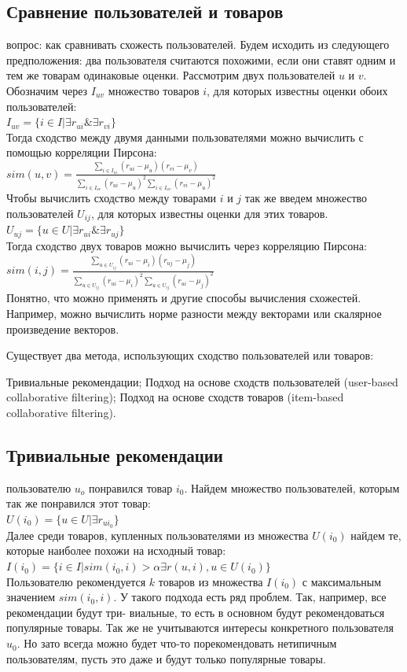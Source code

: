 \documentclass{article}
\newcommand\tab[1][1cm]{\hspace*{#1}}
\begin{document}
\subsection{Сравнение пользователей и товаров}
 вопрос: как сравнивать схожесть пользователей. Будем исходить из следующего предположения: два пользователя считаются похожими, если они ставят одним и тем же товарам одинаковые оценки. Рассмотрим двух пользователей ﻿$u$﻿ и ﻿$v$﻿. Обозначим через ﻿$I_{uv}$ множество товаров ﻿$i$, для которых известны оценки обоих пользователей:\\
$I_{uv}=\{ i\in I | \exists r_{ui} \& \exists r_{vi}\}$\\
Тогда сходство между двумя данными пользователями можно вычислить с помощью корреляции Пирсона:\\
$sim(u,v)=\frac{\sum_{i\in I_{ui}}{(r_{ui}-\mu_u)(r_{vi}-\mu_v)}}{\sum_{i\in I_{uv}}{(r_{ui}-\mu_u)^2}\sum_{i\in I_{uv}}{(r_{vi}-\mu_u)^2}}$\\
Чтобы вычислить сходство между товарами $i$﻿ и ﻿$j$﻿ так же введем множество пользователей ﻿$U_{ij}$﻿, для которых известны оценки для этих товаров.\\
$U_{uj}=\{u\in U|\exists r_{ui} \&\exists r_{uj}\}$\\
Тогда сходство двух товаров можно вычислить через корреляцию Пирсона:\\
$sim(i,j)=\frac{\sum_{u\in U_{ij}}{(r_{ui}-\mu_i)(r_{uj}-\mu_j)}}{\sum_{u\in U_{ij}}{(r_{ui}-\mu_i)^2}\sum_{u\in U_{ij}}{(r_{ui}-\mu_j)^2}}$\\
Понятно, что можно применять и другие способы вычисления схожестей. Например, можно вычислить норме разности между векторами или скалярное произведение векторов.

Существует два метода, использующих сходство пользователей или товаров:

Тривиальные рекомендации;
Подход на основе сходств пользователей (user-based collaborative filtering);
Подход на основе сходств товаров (item-based collaborative filtering).
\subsection{Тривиальные рекомендации}
 пользователю ﻿$u_o$ понравился товар $i_0$. Найдем множество пользователей, которым так же понравился этот товар:\\
$U(i_0)=\{u\in U|\exists r_{ui_0}\}$\\
Далее среди товаров, купленных пользователями из множества ﻿$U(i_0)$ найдем те, которые наиболее похожи на исходный товар:\\
$I(i_0)=\{i\in I|sim(i_0, i)>\alpha \exists r(u, i), u\in U(i_0)\}$\\
Пользователю рекомендуется ﻿$k$ товаров из множества ﻿$I(i_0)$ с максимальным значением $sim(i_0,i)$. У такого подхода есть ряд проблем. Так, например, все рекомендации будут три- виальные, то есть в основном будут рекомендоваться популярные товары. Так же не учитываются интересы конкретного пользователя ﻿$u_0$. Но зато всегда можно будет что-то порекомендовать нетипичным пользователям, пусть это даже и будут только популярные товары.
\end{document}
